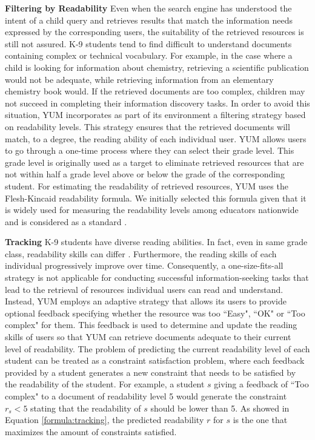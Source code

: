 \documentclass{sig-alternate-05-2015}
\begin{document}
\noindent
\textbf{Filtering by Readability} Even when the search engine has understood the intent of a child query and retrieves results that match the information needs expressed by the corresponding users, the suitability of the retrieved resources is still not assured.  K-9 students tend to find difficult to understand documents containing complex or technical vocabulary. For example, in the case where a child is looking for information about chemistry, retrieving a scientific publication would not be adequate, while retrieving information from an elementary chemistry book would. If the retrieved documents are too complex, children may not succeed in completing their information discovery tasks. In order to avoid this situation, YUM incorporates as part of its environment a filtering strategy based on readability levels. This strategy   ensures that the retrieved documents will match, to a degree, the reading ability of each individual user. YUM allows users to go through a one-time process where they can select their grade level. This grade level is originally used as a target to eliminate retrieved resources that are not within half a grade level above or below the grade of the corresponding student. For estimating the readability of retrieved resources, YUM uses the Flesh-Kincaid \cite{Fle48} readability formula. We initially selected this formula given that it is widely used for measuring the readability levels among educators nationwide and is considered as a standard \cite{Ibr16}.  


\noindent
\textbf{Tracking} K-9 students have diverse reading abilities. In fact, even in same grade class,  readability skills can differ \cite{Bow92}. Furthermore, the reading skills of each individual progressively improve over time\cite{sh13}. Consequently, a one-size-fits-all strategy is not applicable for conducting successful information-seeking tasks that lead to the retrieval of resources individual users can read and understand. Instead, YUM employs an adaptive strategy that allows its users to provide optional feedback specifying whether the resource was too ``Easy", ``OK" or ``Too complex" for them. This feedback is used to determine and update the reading skills of users so that YUM can retrieve documents adequate to their current level of readability.    
The problem of predicting the current readability level of each student can be treated as a constraint satisfaction problem, where each feedback  provided by a student  generates  a new constraint that needs to be satisfied by the readability  of  the student. For example, a student $s$ giving a feedback of ``Too complex" to a document of readability level 5 would generate the constraint $r_s < 5$ stating that the readability of $s$ should be lower than 5. As showed in Equation \ref{formula:tracking}, the predicted readability  $r$  for $s$ is the one that maximizes the amount of constraints satisfied.
\end{document}
